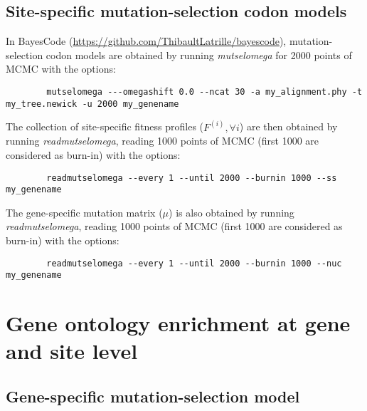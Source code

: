\documentclass{article}
\renewcommand*{\bm}[1]{#1}%
\newcommand{\UniDimArray}[1]{\bm{#1}}
\begin{document}
    \subsection{Site-specific mutation-selection codon models}

    In BayesCode (\url{https://github.com/ThibaultLatrille/bayescode}), mutation-selection codon models are obtained by running \textit{mutselomega} for 2000 points of MCMC with the options:
    \begin{scriptsize}
        \begin{verbatim}
        mutselomega ---omegashift 0.0 --ncat 30 -a my_alignment.phy -t my_tree.newick -u 2000 my_genename
        \end{verbatim}
    \end{scriptsize}
    The collection of site-specific fitness profiles ($\UniDimArray{F^{(i)}}, \forall i$) are then obtained by running \textit{readmutselomega}, reading 1000 points of MCMC (first 1000 are considered as burn-in) with the options:
    \begin{scriptsize}
        \begin{verbatim}
        readmutselomega --every 1 --until 2000 --burnin 1000 --ss my_genename
        \end{verbatim}
    \end{scriptsize}
    The gene-specific mutation matrix ($\UniDimArray{\mu}$) is also obtained by running \textit{readmutselomega}, reading 1000 points of MCMC (first 1000 are considered as burn-in) with the options:
    \begin{scriptsize}
        \begin{verbatim}
        readmutselomega --every 1 --until 2000 --burnin 1000 --nuc my_genename
        \end{verbatim}
    \end{scriptsize}

    \newpage


    \section{Gene ontology enrichment at gene and site level}
    \label{sec:gene-ontology-enrichment}

    \subsection{Gene-specific mutation-selection model}
\end{document}
